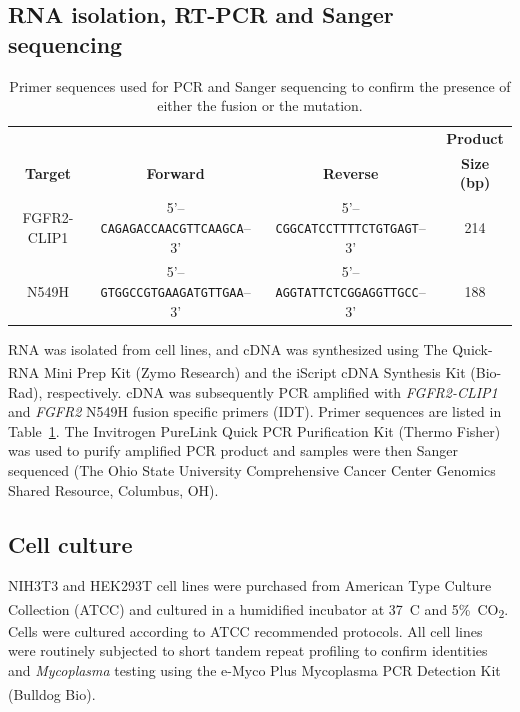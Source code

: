 \subsection{RNA isolation, RT-PCR and Sanger sequencing}
\begin{table}[H]
    {\small
	\begin{center}
		\begin{tabular}{cccc}
			 & & & \textbf{Product} \\
			\textbf{Target} & \textbf{Forward} & \textbf{Reverse} & \textbf{Size (bp)} \\
			\hline
			FGFR2-CLIP1 & 5'--\texttt{CAGAGACCAACGTTCAAGCA}--3' & 5'--\texttt{CGGCATCCTTTTCTGTGAGT}--3' & 214 \\
			N549H & 5'--\texttt{GTGGCCGTGAAGATGTTGAA}--3' & 5'--\texttt{AGGTATTCTCGGAGGTTGCC}--3' & 188
		\end{tabular}
	\end{center}}
	\vspace{-0.3cm}
	\caption[Primer sequences.]{Primer sequences used for PCR and Sanger sequencing to confirm the presence of either the fusion or the mutation.}
	\label{table:240:primer_seqs}
\end{table}
RNA was isolated from cell lines, and cDNA was synthesized using The Quick-RNA Mini Prep Kit (Zymo Research\textsuperscript\texttrademark{}) and the iScript cDNA Synthesis Kit (Bio-Rad), respectively. cDNA was subsequently PCR amplified with \textit{FGFR2-CLIP1} and \textit{FGFR2} N549H fusion specific primers (IDT)\@. Primer sequences are listed in Table~\ref{table:240:primer_seqs}. The Invitrogen PureLink Quick PCR Purification Kit (Thermo Fisher) was used to purify amplified PCR product and samples were then Sanger sequenced (The Ohio State University Comprehensive Cancer Center Genomics Shared Resource, Columbus, OH).

\subsection{Cell culture}
NIH3T3 and HEK293T cell lines were purchased from American Type Culture Collection (ATCC\textsuperscript\textregistered{}) and cultured in a humidified incubator at 37~\textdegree{}C and 5\%~CO\textsubscript{2}. Cells were cultured according to ATCC recommended protocols. All cell lines were routinely subjected to short tandem repeat profiling to confirm identities and \textit{Mycoplasma} testing using the e-Myco Plus Mycoplasma PCR Detection Kit (Bulldog Bio\textsuperscript\texttrademark{}).

